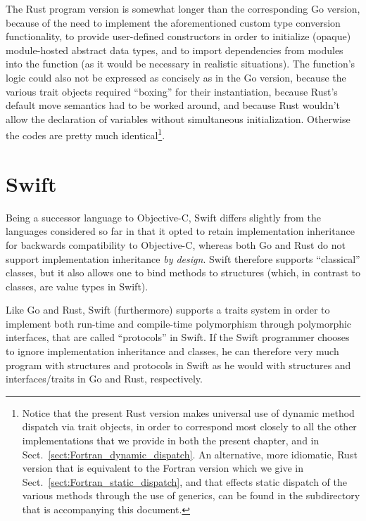 \documentclass[11pt,oneside]{report}
\newcommand{\code}[1]{{\selectfont\ttfamily{#1}}}
\begin{document}


The Rust program version is somewhat longer than the corresponding Go
version, because of the need to implement the aforementioned custom
type conversion functionality, to provide user-defined constructors in
order to initialize (opaque) module-hosted abstract data types, and to
import dependencies from modules into the \code{main} function (as it
would be necessary in realistic situations). The \code{main}
function's logic could also not be expressed as concisely as in the Go
version, because the various trait objects required ``boxing'' for
their instantiation, because Rust's default move semantics had to be
worked around, and because Rust wouldn't allow the declaration of
variables without simultaneous initialization. Otherwise the codes are
pretty much identical\footnote{Notice that the present Rust version
makes universal use of dynamic method dispatch via trait objects, in
order to correspond most closely to all the other implementations that
we provide in both the present chapter, and in
Sect.~\ref{sect:Fortran_dynamic_dispatch}. An alternative, more
idiomatic, Rust version that is equivalent to the Fortran version
which we give in Sect.~\ref{sect:Fortran_static_dispatch}, and that
effects static dispatch of the various \code{sum} methods through the
use of generics, can be found in the \code{Code} subdirectory that is
accompanying this document.}.


\section{Swift}
\label{sect:Swift}

Being a successor language to Objective-C, Swift differs slightly from
the languages considered so far in that it opted to retain
implementation inheritance for backwards compatibility to Objective-C,
whereas both Go and Rust do not support implementation inheritance
\emph{by design}. Swift therefore supports ``classical'' classes, but
it also allows one to bind methods to structures (which, in contrast
to classes, are value types in Swift).

Like Go and Rust, Swift (furthermore) supports a traits system in order
to implement both run-time and compile-time polymorphism through
polymorphic interfaces, that are called ``protocols'' in Swift. If the
Swift programmer chooses to ignore implementation inheritance and
classes, he can therefore very much program with structures and
protocols in Swift as he would with structures and interfaces/traits
in Go and Rust, respectively.
\end{document}
